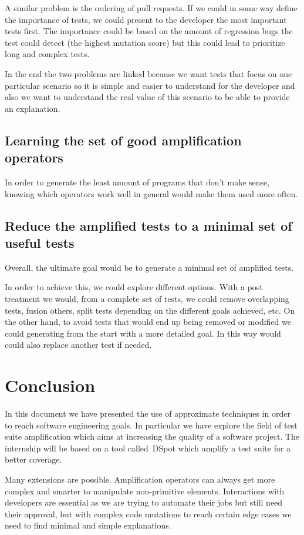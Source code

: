 \documentclass[11pt]{sdm}
\newcommand{\dspot}{DSpot\xspace}
\begin{document}
A similar problem is the ordering of pull requests.
If we could in some way define the importance of tests, we could present to the developer the most important tests first.
The importance could be based on the amount of regression bugs the test could detect (the highest mutation score) but this could lead to prioritize long and complex tests.

In the end the two problems are linked because we want tests that focus on one particular scenario so it is simple and easier to understand for the developer and also we want to understand the real value of this scenario to be able to provide an explanation.

\subsection{Learning the set of good amplification operators}
\label{learning}
In order to generate the least amount of programs that don't make sense, knowing which operators work well in general would make them used more often.

\subsection{Reduce the amplified tests to a minimal set of useful tests}
\label{minimal}
Overall, the ultimate goal would be to generate a minimal set of amplified tests.

In order to achieve this, we could explore different options.
With a post treatment we would, from a complete set of tests, we could remove overlapping tests, fusion others, split tests depending on the different goals achieved, etc.
On the other hand, to avoid tests that would end up being removed or modified we could generating from the start with a more detailed goal.
In this way would could also replace another test if needed.


\section*{Conclusion}
\label{conclu}
In this document we have presented the use of approximate techniques in order to reach software engineering goals.
In particular we have explore the field of test suite amplification which aims at increasing the quality of a software project.
The internship will be based on a tool called~\dspot{} which amplify a test suite for a better coverage.

Many extensions are possible.
Amplification operators can always get more complex and smarter to manipulate non-primitive elements.
Interactions with developers are essential as we are trying to automate their jobs but still need their approval, but with complex code mutations to reach certain edge cases we need to find minimal and simple explanations.




\end{document}
